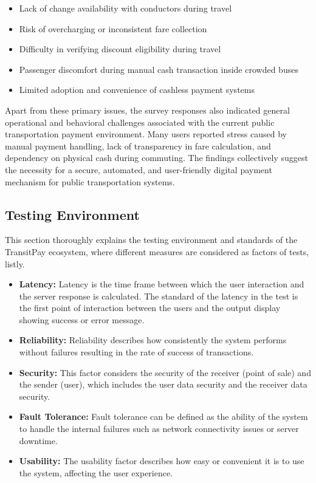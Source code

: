 \documentclass[manuscript,review,anonymous]{acmart}
\begin{document}
\begin{itemize}
    \item Lack of change availability with conductors during travel
    \item Risk of overcharging or inconsistent fare collection
    \item Difficulty in verifying discount eligibility during travel
    \item Passenger discomfort during manual cash transaction inside crowded buses
    \item Limited adoption and convenience of cashless payment systems
    \\
\end{itemize}
Apart from these primary issues, the survey responses also indicated general operational and behavioral challenges associated with the current public transportation payment environment. Many users reported stress caused by manual payment handling, lack of transparency in fare calculation, and dependency on physical cash during commuting. The findings collectively suggest the necessity for a secure, automated, and user-friendly digital payment mechanism for public transportation systems.

\subsection{Testing Environment}
This section thoroughly explains the testing environment and standards of the TransitPay ecosystem, where different measures are considered as factors of tests, listly.

\begin{itemize}
    \item \textbf{Latency:} Latency is the time frame between which the user interaction and the server response is calculated. The standard of the latency in the test is the first point of interaction between the users and the output display showing success or error message.
    \item \textbf{Reliability:} Reliability describes how consistently the system performs without failures resulting in the rate of success of transactions.
    \item \textbf{Security:} This factor considers the security of the receiver (point of sale) and the sender (user), which includes the user data security and the receiver data security.
     \item \textbf{Fault Tolerance:} Fault tolerance can be defined as the ability of the system to handle the internal failures such as network connectivity issues or server downtime.
     \item \textbf{Usability: } The usability factor describes how easy or convenient it is to use the system, affecting the user experience.
\end{itemize}
\end{document}
